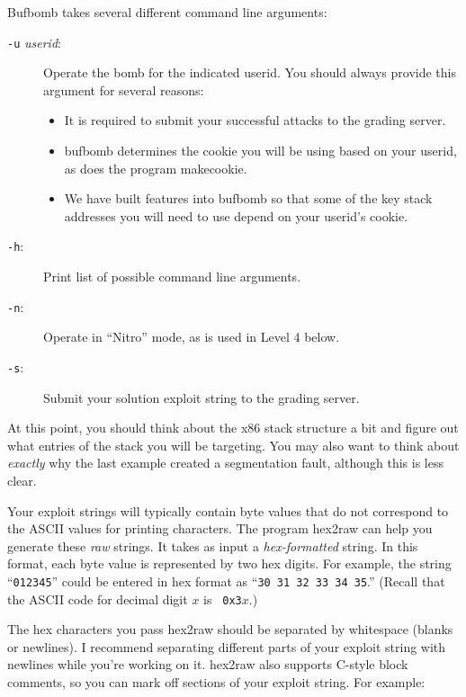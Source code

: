 \documentclass[11pt]{article}
\begin{document}
{\sc Bufbomb} takes several different command line arguments:
\begin{description}
\item[{\tt -u} {\it userid}:] Operate the bomb for the indicated userid.
You should always provide this argument for several reasons:


\begin{itemize}

\item It is required to submit your successful attacks to the grading server.

\item {\sc bufbomb} determines the cookie you will be using based on
your userid, as does the program {\sc makecookie}.

\item We have built features into {\sc bufbomb} so that some of the
key stack addresses you will need to use depend on your userid's
cookie.

\end{itemize}

\item[{\tt -h}:] Print list of possible command line arguments.
\item[{\tt -n}:] Operate in ``Nitro'' mode, as is used in Level 4 below.
\item[{\tt -s}:] Submit your solution exploit string to the grading server.

\end{description}

At this point, you should think about the x86 stack structure a bit
and figure out what entries of the stack you will be targeting. You
may also want to think about {\em exactly} why the last example
created a segmentation fault, although this is less clear.

Your exploit strings will typically contain byte values that do not
correspond to the ASCII values for printing characters.  The program
{\sc hex2raw} can help you generate these {\em raw} strings.  It takes
as input a {\em hex-formatted} string.  In this format, each byte
value is represented by two hex digits.  For example, the string
``{\tt 012345}'' could be entered in hex format as ``{\tt 30 31 32 33
34 35}.'' (Recall that the ASCII code for decimal digit $x$ is {\tt
0x3}$x$.)

The hex characters you pass {\sc hex2raw} should be separated by
whitespace (blanks or newlines). I recommend separating different
parts of your exploit string with newlines while you're working on
it. {\sc hex2raw} also supports C-style block comments, so you can
mark off sections of your exploit string. For example:
\end{document}
